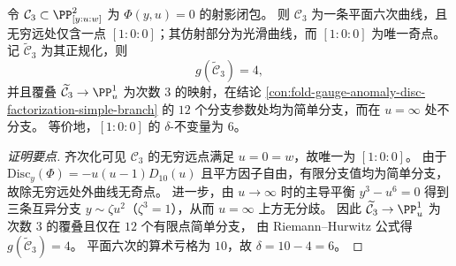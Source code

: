 

\begin{conclusion}[三次分辨曲线的平面六次模型与正规化亏格]\label{con:fold-gauge-anomaly-resolvent-sextic-normalization-genus}
令 \(\mathcal C_3\subset\PP^2_{[y:u:w]}\) 为 \(\Phi(y,u)=0\) 的射影闭包。
则 \(\mathcal C_3\) 为一条平面六次曲线，且无穷远处仅含一点 \([1:0:0]\)；其仿射部分为光滑曲线，而 \([1:0:0]\) 为唯一奇点。
记 \(\widetilde{\mathcal C}_3\) 为其正规化，则
\[
g(\widetilde{\mathcal C}_3)=4,
\]
并且覆叠 \(\widetilde{\mathcal C}_3\to\PP^1_u\) 为次数 \(3\) 的映射，在结论 \ref{con:fold-gauge-anomaly-disc-factorization-simple-branch} 的 \(12\) 个分支参数处均为简单分支，而在 \(u=\infty\) 处不分支。
等价地，\([1:0:0]\) 的 \(\delta\)-不变量为 \(6\)。
\end{conclusion}
\begin{proof}[证明要点]
齐次化可见 \(\mathcal C_3\) 的无穷远点满足 \(u=0=w\)，故唯一为 \([1:0:0]\)。
由于 \(\mathrm{Disc}_y(\Phi)=-u(u-1)D_{10}(u)\) 且平方因子自由，有限分支值均为简单分支，故除无穷远处外曲线无奇点。
进一步，由 \(u\to\infty\) 时的主导平衡 \(y^3-u^6=0\) 得到三条互异分支 \(y\sim \zeta u^2\)（\(\zeta^3=1\)），从而 \(u=\infty\) 上方无分歧。
因此 \(\widetilde{\mathcal C}_3\to\PP^1_u\) 为次数 \(3\) 的覆叠且仅在 \(12\) 个有限点简单分支，
由 Riemann--Hurwitz 公式得 \(g(\widetilde{\mathcal C}_3)=4\)。
平面六次的算术亏格为 \(10\)，故 \(\delta=10-4=6\)。
\end{proof}

